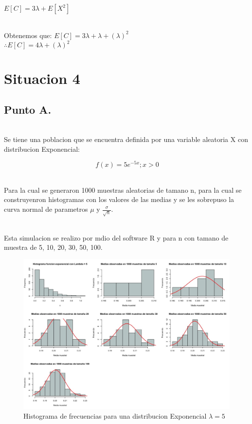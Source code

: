 \documentclass[letterpaper,12pt,onecolumn,titlepage]{article}
\begin{document}
$E[C]=3\lambda + E[X^2]$

~\\Obtenemos que: 
$E[C]=3\lambda + \lambda + (\lambda)^2$
~\\$\therefore E[C] = 4\lambda + (\lambda)^2$

\section{Situacion 4}
\subsection{Punto A.}
~\\Se tiene una poblacion que se encuentra definida por una variable aleatoria X con distribucion Exponencial:

$$\ f(x)=5e^{-5x} ; x>0$$

~\\ Para la cual se generaron 1000 muestras aleatorias de tamano n, para la cual se construyenron histogramas con los valores de las medias y se les sobrepuso la curva normal de parametros $\mu$ y $\frac{\sigma}{\sqrt{n}}$. 

~\\ Esta simulacion se realizo por mdio del software R y para n con tamano de muestra de 5, 10, 20, 30, 50, 100.

\begin{figure}[!h]
    \begin{center}
        \includegraphics[width=15cm]{figuras/4.jpeg}
        \caption{Histograma de frecuencias para una distribucion Exponencial $\lambda=5$}
        \label{fig:Densidad}
    \end{center}
\end{figure}
\end{document}
